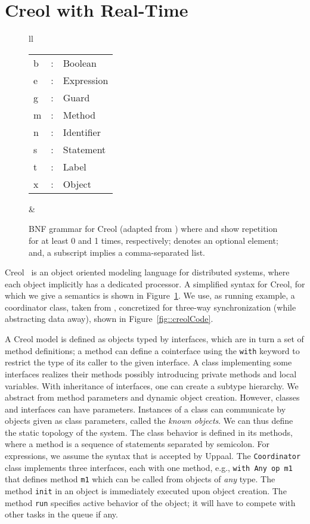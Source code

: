 \documentclass[copyright,creativecommons]{eptcs}
\theoremstyle{definition}
\newcommand{\Uppaal}{{\sc Uppaal}\xspace}
\begin{document}
\section{Creol with Real-Time}
\label{sec::rtcreol}

\lstset{language=Credo, basicstyle=\scriptsize\ttfamily} 

\begin{figure}[tb]
\begin{tabular}{ll}
{ \small \begin{tabular}{l@{~}c@{~~}l}
b &:& Boolean \\
e &:& Expression \\
g&:& Guard  \\
m&:&Method \\
n &:& Identifier \\
s &:& Statement \\
t &:& Label \\
x &:& Object \\

\end{tabular}
}
&
{\small

}
\end{tabular}
\caption{BNF  grammar for Creol (adapted from \cite{johnsen07sosym}) where  and  show repetition for at least 0 and 1 times, respectively;  denotes an optional element; and, a subscript  implies a comma-separated list.}\label{fig::creolSyntax}
\end{figure}


Creol~\cite{johnsen07sosym} is an object oriented modeling language for distributed systems, where each object implicitly has a dedicated processor.
A simplified syntax for Creol, for which we give a semantics is shown in Figure~\ref{fig::creolSyntax}.
We use, as running example, a coordinator class, taken from \cite{johnsen07sosym}, concretized for three-way synchronization (while abstracting data away), shown in Figure~\ref{fig::creolCode}.

A Creol model is defined as objects typed by interfaces, which are in turn a set of method definitions; a method can define a cointerface using the \lstinline{with} keyword to restrict the type of its caller to the given interface.
A class implementing some interfaces realizes their methods possibly introducing private methods and local variables.
With inheritance of interfaces, one can create a subtype hierarchy.
We abstract from method parameters and dynamic object creation.
However, classes and interfaces can have parameters. Instances of a class can communicate by objects given as class parameters, called the {\em known objects}. We  can thus define the static topology of the system.
The class behavior is defined in its methods, where a method is a sequence of statements separated by semicolon.
For expressions, we assume the syntax that is accepted by \Uppaal.
The \lstinline{Coordinator} class implements three interfaces, each with one method, e.g., \lstinline{with Any op m1} that defines method \lstinline{m1} which can be called from objects of {\em any} type.
The method \lstinline{init} in an object is immediately executed upon object creation.
The method \lstinline{run} specifies active behavior of the object; it will have to compete with other tasks in the queue if any.
\end{document}

